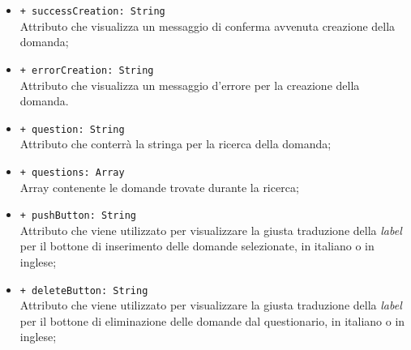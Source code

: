 \begin{itemize}
\begin{itemize}
			\item \texttt{+ successCreation: String} \\ Attributo che visualizza un messaggio di conferma avvenuta creazione della domanda;
			\item \texttt{+ errorCreation: String} \\ Attributo che visualizza un messaggio d'errore per la creazione della domanda.
			\item \texttt{+ question: String} \\ Attributo che conterrà la stringa per la ricerca della domanda;
			\item \texttt{+ questions: Array} \\ Array contenente le domande trovate durante la ricerca;
			\item \texttt{+ pushButton: String} \\ Attributo che viene utilizzato per visualizzare la giusta traduzione della \textit{label} per il bottone di inserimento delle domande selezionate, in italiano o in inglese;
			\item \texttt{+ deleteButton: String} \\ Attributo che viene utilizzato per visualizzare la giusta traduzione della \textit{label} per il bottone di eliminazione delle domande dal questionario, in italiano o in inglese;
		\end{itemize}
\end{itemize}
